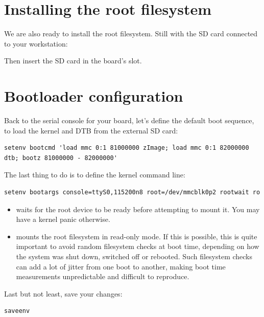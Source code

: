 \section{Installing the root filesystem}

We are also ready to install the root filesystem. Still with the SD card
connected to your workstation:


Then insert the SD card in the board's slot.

\section{Bootloader configuration}

Back to the serial console for your board, let's define the default boot
sequence, to load the kernel and DTB from the external SD card:

{\footnotesize
\begin{verbatim}
setenv bootcmd 'load mmc 0:1 81000000 zImage; load mmc 0:1 82000000 dtb; bootz 81000000 - 82000000'
\end{verbatim}
}

{\footnotesize
The last thing to do is to define the kernel command line:
\begin{verbatim}
setenv bootargs console=ttyS0,115200n8 root=/dev/mmcblk0p2 rootwait ro
\end{verbatim}
}

\begin{itemize}
\item {} waits for the root device to be ready before
attempting to mount it. You may have a kernel panic otherwise.
\item {} mounts the root filesystem in read-only mode.
If this is possible, this is quite important to avoid random
filesystem checks at boot time, depending on how the system was shut
down, switched off or rebooted. Such filesystem checks can add a lot
of jitter from one boot to another, making boot time measurements
unpredictable and difficult to reproduce.
\end{itemize}

Last but not least, save your changes:
\begin{verbatim}
saveenv
\end{verbatim}

